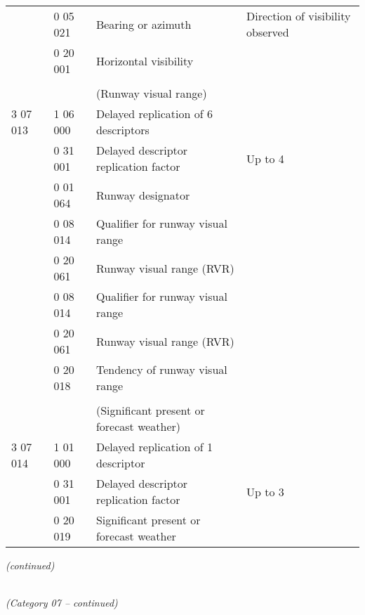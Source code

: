 \begin{longtable}[]{@{}llll@{}}
& 0 05 021 & Bearing or azimuth & Direction of visibility observed\tabularnewline
& 0 20 001 & Horizontal visibility &\tabularnewline
& & &\tabularnewline
& & (Runway visual range) &\tabularnewline
3 07 013 & 1 06 000 & Delayed replication of 6 descriptors &\tabularnewline
& 0 31 001 & Delayed descriptor replication factor & Up to 4\tabularnewline
& 0 01 064 & Runway designator &\tabularnewline
& 0 08 014 & Qualifier for runway visual range &\tabularnewline
& 0 20 061 & Runway visual range (RVR) &\tabularnewline
& 0 08 014 & Qualifier for runway visual range &\tabularnewline
& 0 20 061 & Runway visual range (RVR) &\tabularnewline
& 0 20 018 & Tendency of runway visual range &\tabularnewline
& & &\tabularnewline
& & (Significant present or forecast weather) &\tabularnewline
3 07 014 & 1 01 000 & Delayed replication of 1 descriptor &\tabularnewline
& 0 31 001 & Delayed descriptor replication factor & Up to 3\tabularnewline
& 0 20 019 & Significant present or forecast weather &\tabularnewline
\bottomrule
\end{longtable}

\emph{(continued)}

\emph{\\
(Category 07 -- continued)}

